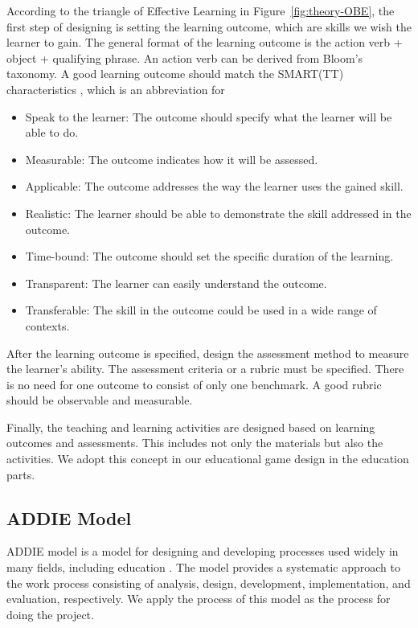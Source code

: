 \documentclass[12pt,oneside,openright,a4paper]{cpe-english-project}
\begin{document}
According to the triangle of Effective Learning in Figure~\ref{fig:theory-OBE}, the first step of designing is setting the learning outcome, which are skills we wish the learner to gain. The general format of the learning outcome is the action verb + object + qualifying phrase. An action verb can be derived from Bloom's taxonomy. A good learning outcome should match the SMART(TT) characteristics \cite{reginelo}, which is an abbreviation for

\begin{itemize}
	\item Speak to the learner: The outcome should specify what the learner will be able to do.
	\item Measurable: The outcome indicates how it will be assessed.
	\item Applicable: The outcome addresses the way the learner uses the gained skill.
	\item Realistic: The learner should be able to demonstrate the skill addressed in the outcome.
	\item Time-bound: The outcome should set the specific duration of the learning.
	\item Transparent: The learner can easily understand the outcome.
	\item Transferable: The skill in the outcome could be used in a wide range of contexts.
\end{itemize}

After the learning outcome is specified, design the assessment method to measure the learner's ability. The assessment criteria or a rubric must be specified. There is no need for one outcome to consist of only one benchmark. A good rubric should be observable and measurable.

Finally, the teaching and learning activities are designed based on learning outcomes and assessments. This includes not only the materials but also the activities. We adopt this concept in our educational game design in the education parts.

\subsection{ADDIE Model}
ADDIE model is a model for designing and developing processes used widely in many fields, including education \cite{isfetaddie}. The model provides a systematic approach to the work process consisting of analysis, design, development, implementation, and evaluation, respectively. We apply the process of this model as the process for doing the project.
\end{document}
